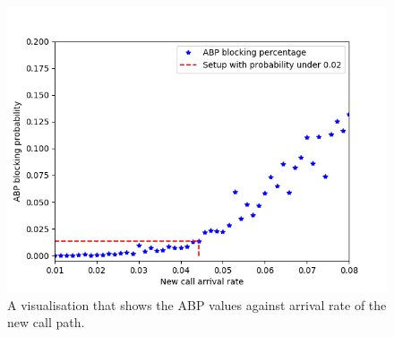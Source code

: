 \documentclass{ecmm427_assignment}
\begin{document}
\begin{figure}[H]
 \centering
\includegraphics[scale=0.65]{M1+M2MCCABP.png}
\caption{A visualisation that shows the ABP values against arrival rate of the new call path.}
\end{figure}
\end{document}

